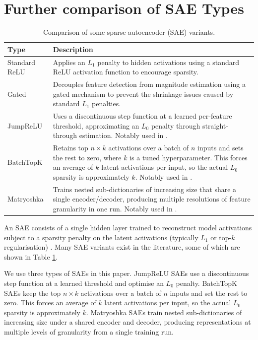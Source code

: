 \section{Further comparison of SAE Types}\label{app:sae_types}

\begin{table}[htbp]
\centering
\caption{Comparison of some sparse autoencoder (SAE) variants.}
\label{tab:sae_types}
\begin{tabular}{p{2.5cm}p{12.5cm}}
\toprule
\textbf{Type} & \textbf{Description} \\
\midrule
Standard ReLU \cite{bricken2023monosemanticity}
  & Applies an $L_1$ penalty to hidden activations using a standard ReLU activation function to encourage sparsity. \\
\addlinespace
Gated \cite{rajamanoharan2024improving}
  & Decouples feature detection from magnitude estimation using a gated mechanism to prevent the shrinkage issues caused by standard $L_1$ penalties. \\
\addlinespace
JumpReLU \cite{rajamanoharan2024jumping}
  & Uses a discontinuous step function at a learned per-feature threshold, approximating an $L_0$ penalty through straight-through estimation. Notably used in \citet{lieberum2024gemma}. \\
\addlinespace
BatchTopK \cite{bussmann2024batchtopk}
  & Retains top $n \times k$ activations over a batch of $n$ inputs and sets the rest to zero, where $k$ is a tuned hyperparameter. This forces an average of $k$ latent activations per input, so the actual $L_0$ sparsity is approximately $k$. Notably used in \citet{Brixi2026, karvonen2025saebench}. \\
\addlinespace
Matryoshka \cite{bussmann2025learning}
  & Trains nested sub-dictionaries of increasing size that share a single encoder/decoder, producing multiple resolutions of feature granularity in one run. Notably used in \citet{mcdougall2025gemmascope2}. \\
\bottomrule
\end{tabular}
\end{table}

An SAE consists of a single hidden layer trained to reconstruct model activations subject to a sparsity penalty on the latent activations (typically $L_1$ or top-$k$ regularisation) \citep{huben2024sparse, bricken2023monosemanticity}.
Many SAE variants exist in the literature, some of which are shown in Table \ref{tab:sae_types}.

We use three types of SAEs in this paper.
JumpReLU SAEs \citep{rajamanoharan2024jumping} use a discontinuous step function at a learned threshold and optimise an $L_0$ penalty.
BatchTopK SAEs \citep{bussmann2024batchtopk} keep the top $n \times k$ activations over a batch of $n$ inputs and set the rest to zero. This forces an average of $k$ latent activations per input, so the actual $L_0$ sparsity is approximately $k$. 
Matryoshka SAEs \citep{bussmann2025learning} train nested sub-dictionaries of increasing size under a shared encoder and decoder, producing representations at multiple levels of granularity from a single training run.
